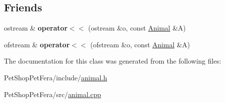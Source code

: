 \subsection*{Friends}
\begin{DoxyCompactItemize}
\item 
\mbox{\label{class_animal_a7d46d04c2c355d2d6d42c0596564d9c9}} 
ostream \& {\bfseries operator$<$$<$} (ostream \&o, const \mbox{\hyperlink{class_animal}{Animal}} \&A)
\item 
\mbox{\label{class_animal_a2dffaf38fb1d12c2075d25a3516e35e4}} 
ofstream \& {\bfseries operator$<$$<$} (ofstream \&o, const \mbox{\hyperlink{class_animal}{Animal}} \&A)
\end{DoxyCompactItemize}


The documentation for this class was generated from the following files\+:\begin{DoxyCompactItemize}
\item 
Pet\+Shop\+Pet\+Fera/include/\mbox{\hyperlink{animal_8h}{animal.\+h}}\item 
Pet\+Shop\+Pet\+Fera/src/\mbox{\hyperlink{animal_8cpp}{animal.\+cpp}}\end{DoxyCompactItemize}
